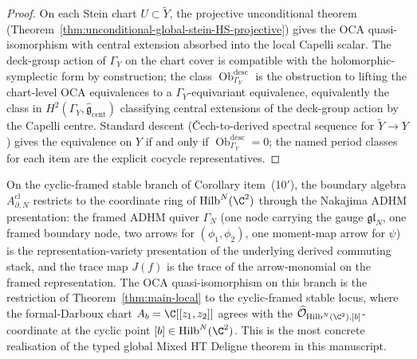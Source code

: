 \begin{proof}
On each Stein chart \(U\subset\widetilde Y\), the projective
unconditional theorem
(Theorem~\ref{thm:unconditional-global-stein-HS-projective}) gives
the OCA quasi-isomorphism with central extension absorbed into the
local Capelli scalar.  The deck-group action of \(\Gamma_Y\) on the
chart cover is compatible with the holomorphic-symplectic form by
construction; the class
\(\operatorname{Ob}^{\mathrm{desc}}_{\Gamma_Y}\) is the obstruction
to lifting the chart-level OCA equivalences to a
\(\Gamma_Y\)-equivariant equivalence, equivalently the class in
\(H^2(\Gamma_Y,\widehat{\mathfrak g}_{\mathrm{cent}})\) classifying
central extensions of the deck-group action by the Capelli centre.
Standard descent (\v Cech-to-derived spectral sequence for
\(\widetilde Y\to Y\)) gives the equivalence on \(Y\) if and only if
\(\operatorname{Ob}^{\mathrm{desc}}_{\Gamma_Y}=0\); the named period
classes for each item are the explicit cocycle representatives.
\end{proof}

\begin{rmk}\label{rmk:nakajima-quiver-OCA}
On the cyclic-framed stable branch of Corollary item~(10$'$), the
boundary algebra \(A^{\mathrm{cl}}_{\partial,N}\) restricts to the
coordinate ring of \(\mathrm{Hilb}^N(\C^2)\) through the Nakajima
ADHM presentation: the framed ADHM quiver \(\Gamma_N\) (one node
carrying the gauge \(\mathfrak{gl}_N\), one framed boundary node, two
arrows for \((\phi_1,\phi_2)\), one moment-map arrow for \(\psi\)) is
the representation-variety presentation of the underlying derived
commuting stack, and the trace map \(J(f)\) is the trace of the
arrow-monomial on the framed representation.  The OCA
quasi-isomorphism on this branch is the restriction of
Theorem~\ref{thm:main-local} to the cyclic-framed stable locus,
where the formal-Darboux chart \(A_b=\C[[z_1,z_2]]\) agrees with the
\(\widehat{\mathcal O}_{\mathrm{Hilb}^N(\C^2),[b]}\)-coordinate at the
cyclic point \([b]\in\mathrm{Hilb}^N(\C^2)\).  This is the most
concrete realisation of the typed global Mixed HT Deligne theorem in
this manuscript.
\end{rmk}


